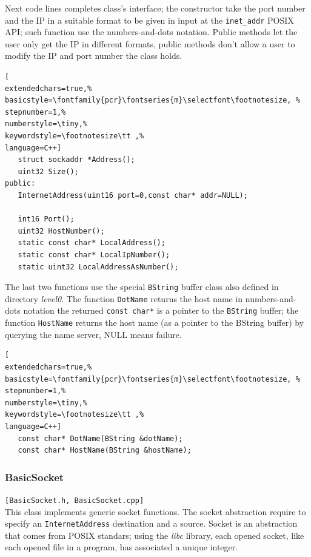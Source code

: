 Next code lines completes class's interface; the constructor take the port number and the IP in a suitable format to be given in input at the  \texttt{inet\_addr} POSIX API; such function use the numbers-and-dots notation. Public methods let the user only get the IP in different formats, public methods don't allow a user to modify the IP and port number the class holds.

\begin{lstlisting}[
extendedchars=true,%
basicstyle=\fontfamily{pcr}\fontseries{m}\selectfont\footnotesize, %
stepnumber=1,%
numberstyle=\tiny,%
keywordstyle=\footnotesize\tt ,%
language=C++]
   struct sockaddr *Address();
   uint32 Size();
public:
   InternetAddress(uint16 port=0,const char* addr=NULL);

   int16 Port();
   uint32 HostNumber();
   static const char* LocalAddress();
   static const char* LocalIpNumber();
   static uint32 LocalAddressAsNumber();
\end{lstlisting}

The last two functions use the special \texttt{BString} buffer class also defined in directory \textit{level0}. The function \texttt{DotName}
returns the host name in numbers-and-dots notation the returned \texttt{const char*} is a pointer to the \texttt{BString} buffer; the function \texttt{HostName} returns the host name (as a pointer to the BString buffer) by querying the name server, NULL means failure.

\begin{lstlisting}[
extendedchars=true,%
basicstyle=\fontfamily{pcr}\fontseries{m}\selectfont\footnotesize, %
stepnumber=1,%
numberstyle=\tiny,%
keywordstyle=\footnotesize\tt ,%
language=C++]
   const char* DotName(BString &dotName);
   const char* HostName(BString &hostName);
\end{lstlisting}



\subsubsection{BasicSocket}
\texttt{[BasicSocket.h, BasicSocket.cpp]}\\
This class implements generic socket functions. The socket abstraction require to specify an \texttt{InternetAddress} destination and a source. Socket is an abstraction that comes from POSIX standars; using the \textit{libc} library, each opened socket, like each opened file in a program, has associated a unique integer.

